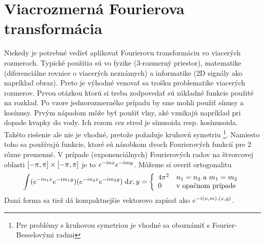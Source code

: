 \section{Viacrozmerná Fourierova transformácia}

Niekedy je potrebné vedieť aplikovať Fourierovu transformáciu vo
viacerých rozmeroch. Typické použitia sú vo fyzike (3-rozmerný
priestor), matematike (diferenciálne rovnice o viacerých neznámych) a
informatike (2D signály ako napríklad obraz). Preto je výhodné venovať
sa trošku problematike viacerých rozmerov. Prvou otázkou ktorú si
treba zodpovedať sú základné funkcie použité na rozklad. Po vzore
jednorozmerného prípadu by sme mohli použiť sínusy a kosínusy. Prvým
nápadom môže byť použiť vlny, aké vznikajú napríklad pri dopade kvapky
do vody. Ich rezom cez stred je sínusoida resp. kosínusoida. Takéto
riešenie ale nie je vhodné, pretože požaduje kruhovú
symetriu \footnote{Pre problémy s kruhovou symetriou je vhodné sa
oboznámiť s Fourier-Besselovými radmi}. Namiesto toho sa používajú
funkcie, ktoré sú násobkom dvoch Fourierových funkcií pre 2 rôzne
premenné. V prípade (exponenciálnych) Fourierových radov na štvorcovej oblasti
$[-\pi,\pi]\times[-\pi,\pi]$ je to
$e^{-\hat{\imath} n x} e^{-\hat{\imath} m y}$. Môžeme si overiť ortogonalitu
\begin{equation}
 \int (e^{-\hat{\imath} n_1 x} e^{-\hat{\imath} m_1 y}) 
      (e^{-\hat{\imath} n_2 x} e^{-\hat{\imath} m_2 y}) \; \mathrm{d} x,y =
    \left\{
        \begin{array}{l l}
            4\pi^2& n_1 = n_2\text{ a }m_1 = m_2\\
            0& \text{v opačnom prípade}
        \end{array}
    \right.
\end{equation}
Daná forma sa tiež dá kompaktnejšie vektorovo zapísať ako 
$e^{-\hat{\imath} (n,m).(x,y)}$.

